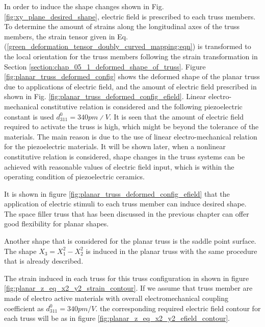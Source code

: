 In order to induce the shape changes shown in Fig. \ref{fig:xy_plane_desired_shape}, electric field is prescribed to each truss members. To determine the amount of strains along the longitudinal axes of the truss members, the strain tensor given in Eq. (\ref{green_deformation_tensor_doubly_curved_mapping:eqn}) is transformed to the local orientation for the truss members following the strain transformation in Section \ref{section:chap_05_1_deformed_shape_of_truss}. Figure \ref{fig:planar_truss_deformed_config} shows the deformed shape of the planar truss due to applications of electric field, and the amount of electric field prescribed in shown in Fig. \ref{fig:planar_truss_deformed_config_efield}. Linear electro-mechanical constitutive relation is considered and the following piezoelectric constant is used $d_{311}^0 = 340pm∕V$. It is seen that the amount of electric field required to activate the truss is high, which might be beyond the tolerance of the materials. The main reason is due to the use of linear electro-mechanical relation for the piezoelectric materials. It will be shown later, when a nonlinear constitutive relation is considered, shape changes in the truss systems can be achieved with reasonable values of electric field input, which is within the operating condition of piezoelectric ceramics. 

It is shown in figure \ref{fig:planar_truss_deformed_config_efield} that the application of electric stimuli to each truss member can induce desired shape. The space filler truss that has been discussed in the previous chapter can offer good flexibility for planar shapes. 

Another shape that is considered for the planar truss is the saddle point surface. The shape $X_3=X_1^2-X_2^2$ is induced in the planar truss with the same procedure that is already described. 



The strain induced in each truss for this truss configuration in shown in figure \ref{fig:planar_z_eq_x2_y2_strain_contour}.  If we assume that truss member are made of electro active materials with overall electromechanical coupling coefficient as $d_{311}^0=340pm/V$. the corresponding required electric field contour for each truss will be as in figure \ref{fig:planar_z_eq_x2_y2_efield_contour}. 


